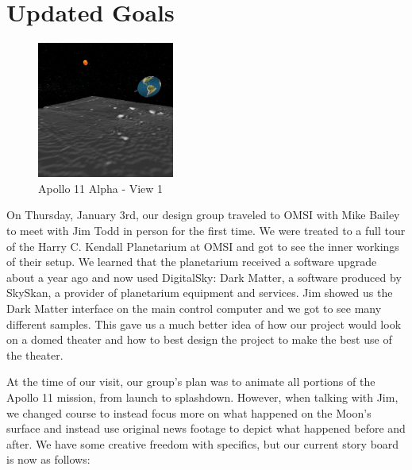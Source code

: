 \documentclass[onecolumn, draftclsnofoot,10pt, compsoc]{IEEEtran}
\begin{document}
\clearpage


\section{Updated Goals}

\begin{figure}
    \includegraphics[width=0.4\textwidth]{View1.PNG} 
    \caption{Apollo 11 Alpha - View 1}
    \label{fig:View 1}
\end{figure}

On Thursday, January 3rd, our design group traveled to OMSI with Mike Bailey to meet with Jim Todd in person for the first time. We were treated to a full tour of the Harry C. Kendall Planetarium at OMSI and got to see the inner workings of their setup. We learned that the planetarium received a software upgrade about a year ago and now used DigitalSky: Dark Matter, a software produced by SkySkan, a provider of planetarium equipment and services. Jim showed us the Dark Matter interface on the main control computer and we got to see many different samples. This gave us a much better idea of how our project would look on a domed theater and how to best design the project to make the best use of the theater. 

At the time of our visit, our group's plan was to animate all portions of the Apollo 11 mission, from launch to splashdown. However, when talking with Jim, we changed course to instead focus more on what happened on the Moon's surface and instead use original news footage to depict what happened before and after. We have some creative freedom with specifics, but our current story board is now as follows: 
\end{document}
